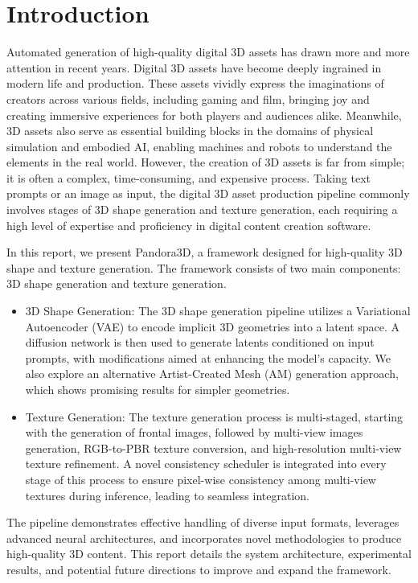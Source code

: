 \section{Introduction}

Automated generation of high-quality digital 3D assets has drawn more and more attention in recent years. Digital 3D assets have become deeply ingrained in modern life and production. These assets vividly express the imaginations of creators across various fields, including gaming and film, bringing joy and creating immersive experiences for both players and audiences alike. Meanwhile, 3D assets also serve as essential building blocks in the domains of physical simulation and embodied AI, enabling machines and robots to understand the elements in the real world. However, the creation of 3D assets is far from simple; it is often a complex, time-consuming, and expensive process. Taking text prompts or an image as input, the digital 3D asset production pipeline commonly involves stages of 3D shape generation and texture generation, each requiring a high level of expertise and proficiency in digital content creation software.

In this report, we present Pandora3D, a framework designed for high-quality 3D shape and texture generation. The framework consists of two main components: 3D shape generation and texture generation.

\begin{itemize}
    \item 3D Shape Generation: The 3D shape generation pipeline utilizes a Variational Autoencoder (VAE) to encode implicit 3D geometries into a latent space. A diffusion network is then used to generate latents conditioned on input prompts, with modifications aimed at enhancing the model's capacity. We also explore an alternative Artist-Created Mesh (AM) generation approach, which shows promising results for simpler geometries.

    \item Texture Generation: The texture generation process is multi-staged, starting with the generation of frontal images, followed by multi-view images generation, RGB-to-PBR texture conversion, and high-resolution multi-view texture refinement. A novel consistency scheduler is integrated into every stage of this process to ensure pixel-wise consistency among multi-view textures during inference, leading to seamless integration.
\end{itemize}

The pipeline demonstrates effective handling of diverse input formats, leverages advanced neural architectures, and incorporates novel methodologies to produce high-quality 3D content. This report details the system architecture, experimental results, and potential future directions to improve and expand the framework.